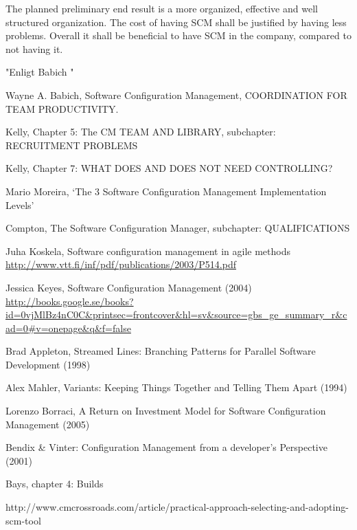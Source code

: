 \documentclass[10pt]{article}
\begin{document}
\noindent The planned preliminary end result is a more organized, effective and well structured organization. The cost of having SCM shall be justified by having less problems. Overall it shall be beneficial to have SCM in the company, compared to not having it.


"Enligt Babich \cite{Babich}"


\begin{thebibliography}{1}

 Wayne A. Babich, Software Configuration Management, COORDINATION FOR TEAM PRODUCTIVITY.

 Kelly, Chapter 5: The CM TEAM AND LIBRARY, subchapter: RECRUITMENT PROBLEMS 

 Kelly, Chapter 7: WHAT DOES AND DOES NOT NEED CONTROLLING? 

 Mario Moreira, ‘The 3 Software Configuration Management Implementation Levels’

Compton, The Software Configuration Manager, subchapter: QUALIFICATIONS

Juha Koskela, Software configuration management in agile methods
\url{http://www.vtt.fi/inf/pdf/publications/2003/P514.pdf}

 Jessica Keyes, Software Configuration Management (2004) \url{http://books.google.se/books?id=0vjMlBz4nC0C&printsec=frontcover&hl=sv&source=gbs_ge_summary_r&cad=0#v=onepage&q&f=false}

 Brad Appleton, Streamed Lines: Branching Patterns for Parallel Software Development (1998)

 Alex Mahler, Variants: Keeping Things Together and Telling Them Apart (1994)

 Lorenzo Borraci, A Return on Investment Model for Software Configuration Management (2005)

 Bendix \& Vinter: Configuration Management from a developer's Perspective (2001)

 Bays, chapter 4: Builds

 http://www.cmcrossroads.com/article/practical-approach-selecting-and-adopting-scm-tool

\end{thebibliography}
\end{document}
